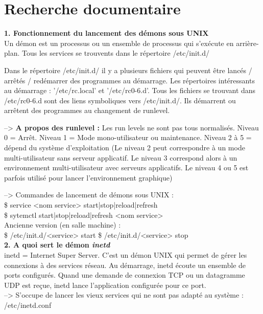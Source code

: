 \documentclass[a4paper]{article}
\begin{document}
	\section{Recherche documentaire}
\noindent	
\textbf{1. Fonctionnement du lancement des démons sous UNIX}	\\

Un démon est un processus ou un ensemble de processus qui s'exécute en arrière-plan.
Tous les services se trouvents dans le répertoire /etc/init.d/  

Dans le répertoire /etc/init.d/ il y a plusieurs fichiers qui peuvent être lancés / arrêtés / redémarrer des programmes au démarrage. Les répertoires intéressants au démarrage : '/etc/rc.local' et '/etc/rc{0-6}.d'. Tous les fichiers se trouvant dans /etc/rc{0-6}.d sont des liens symboliques vers /etc/init.d/. Ils démarrent ou arrêtent des programmes au changement de runlevel. 

--> \textbf{A propos des runlevel :}
Les run levels ne sont pas tous normalisés. Niveau 0 = Arrêt. Niveau 1 = Mode mono-utilisateur ou maintenance. Niveau 2 à 5 = dépend du système d'exploitation (Le niveau 2 peut correspondre à un mode multi-utilisateur sans serveur applicatif. Le niveau 3 correspond alors à un environnement multi-utilisateur avec serveurs applicatifs. Le niveau 4 ou 5 est parfois utilisé pour lancer l'environnement graphique)

--> Commandes de lancement de démons sous UNIX : \\
\$ service <nom service> start|stop|reload|refresh \\
\$ sytemctl start|stop|reload|refresh <nom service> \\

Ancienne version (en salle machine) : \\
\$ /etc/init.d/<service> start
\$ /etc/init.d/<service> stop \\


\textbf{2. A quoi sert le démon \textit{inetd}} \\

inetd = Internet Super Server. C'est un démon UNIX qui permet de gérer les connexions à des services réseau. Au démarrage, inetd écoute un ensemble de ports configurés. Quand une demande de connexion TCP ou un datagramme UDP est reçue, inetd lance l'application configurée pour ce port. \\

--> S’occupe de lancer les vieux services qui ne sont pas adapté au système : /etc/inetd.conf
\end{document}
